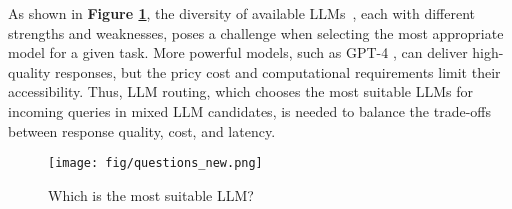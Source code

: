 
As shown in \textbf{Figure \ref{intro_question}}, the diversity of available LLMs~\cite{jiang2024empowering, gong2024evolutionary, li2023sehf, li2024sade, wang2022hierarchal, wang2024llm, wang2024lcmdc}, each with different strengths and weaknesses, poses a challenge when selecting the most appropriate model for a given task. More powerful models, such as GPT-4 \cite{achiam2023gpt}, can deliver high-quality responses, but the pricy cost and computational requirements limit their accessibility. 
Thus, LLM routing, which chooses the most suitable LLMs for incoming queries in mixed LLM candidates, is needed to balance the trade-offs between response quality, cost, and latency.


\begin{figure}
\centering
\texttt{[image: fig/questions\_new.png]}
\caption{Which is the most suitable LLM?}
\label{intro_question}
\end{figure}

